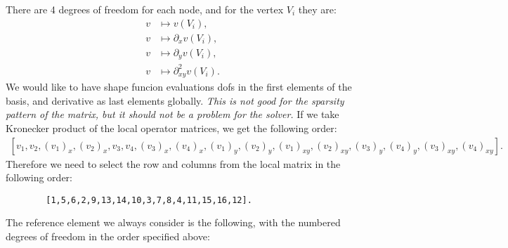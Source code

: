 \documentclass[]{report}
\begin{document}
    There are 4 degrees of freedom for each node, and for the vertex $V_i$ they are:
    \begin{align*}
        v &\mapsto v(V_i), \\
        v &\mapsto \partial_x v(V_i), \\
        v &\mapsto \partial_y v(V_i), \\
        v &\mapsto \partial^2_{xy} v(V_i).
    \end{align*}
    We would like to have shape funcion evaluations dofs in the first elements of the basis, and derivative as last elements globally. 
    {\itshape This is not good for the sparsity pattern of the matrix, but it should not be a problem for the solver.}
    If we take Kronecker product of the local operator matrices, we get the following order:
    \begin{align*}
        \left[
            v_1, v_2, (v_1)_x, (v_2)_x,
            v_3, v_4, (v_3)_x, (v_4)_x,
            (v_1)_y, (v_2)_y, (v_1)_{xy}, (v_2)_{xy},
            (v_3)_y, (v_4)_y, (v_3)_{xy}, (v_4)_{xy}
            \right].
    \end{align*}
    Therefore we need to select the row and columns from the local matrix in the following order:
    \begin{lstlisting}
        [1,5,6,2,9,13,14,10,3,7,8,4,11,15,16,12].
    \end{lstlisting}
    The reference element we always consider is the following, with the numbered degrees of freedom in the order specified above:
    \begin{center}
    \end{center}
    
\end{document}
